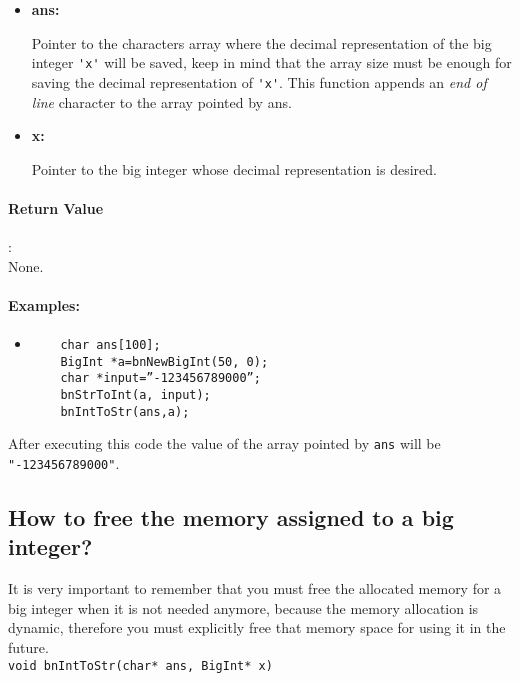 \documentclass{book}
\begin{document}
\begin{itemize}
\item{\bf ans:}

Pointer to the characters array where the decimal representation of the big integer \verb+'x'+ will be saved, keep in mind that the array size must be enough for saving the decimal representation of \verb+'x'+. This  function appends an \emph{end of line} character to the array pointed by ans.

\item {\bf x:}

Pointer to the big integer whose decimal representation is desired.

\end{itemize}

\paragraph{Return Value}:\\

None.

\paragraph{Examples:}

\begin{itemize}
\item

\begin{verbatim}
	char ans[100];
	BigInt *a=bnNewBigInt(50, 0);
	char *input=”-123456789000”;
	bnStrToInt(a, input);
	bnIntToStr(ans,a);
\end{verbatim}
\end{itemize}

After executing this code the value of the array pointed by \verb+ans+ will be \verb+"-123456789000"+.

\subsection{How to free the memory assigned to a big integer?}

It is very important to remember that you must free the allocated memory for a big integer when it is not needed anymore, because the memory allocation is dynamic, therefore you must explicitly free that memory space for using it in the future.\\

\verb+void bnIntToStr(char* ans, BigInt* x)+\\
\end{document}
